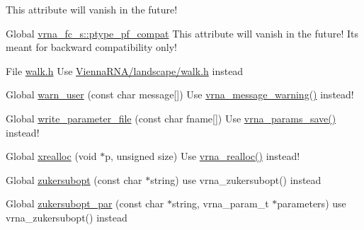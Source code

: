 \begin{DoxyRefList}
%
This attribute will vanish in the future!  
\item[Global \mbox{\hyperlink{group__fold__compound_a7fe1235ce3d41287695f1ae1e283e8fc}{vrna\+\_\+fc\+\_\+s\+::ptype\+\_\+pf\+\_\+compat}} ]\label{deprecated__deprecated000079}%
%
This attribute will vanish in the future! It\textquotesingle{}s meant for backward compatibility only!  
\item[File \mbox{\hyperlink{walk_8h}{walk.h}} ]\label{deprecated__deprecated000141}%
%
Use \mbox{\hyperlink{landscape_2walk_8h}{Vienna\+RNA/landscape/walk.\+h}} instead  
\item[Global \mbox{\hyperlink{utils_2basic_8h_af2355fa8746f2f30fbe71db65dea3d51}{warn\+\_\+user}} (const char message\mbox{[}\mbox{]})]\label{deprecated__deprecated000185}%
%
Use \mbox{\hyperlink{group__message__utils_ga6e07ed24add60693ba886d54d0a46635}{vrna\+\_\+message\+\_\+warning()}} instead!  
\item[Global \mbox{\hyperlink{group__energy__parameters__rw_ga8a43459be386a7489feeab68dc2c6c76}{write\+\_\+parameter\+\_\+file}} (const char fname\mbox{[}\mbox{]})]\label{deprecated__deprecated000153}%
%
Use \mbox{\hyperlink{group__energy__parameters__rw_ga0de3731b3e4017c52bd678549f6c4ae5}{vrna\+\_\+params\+\_\+save()}} instead!  
\item[Global \mbox{\hyperlink{utils_2basic_8h_a9037ada838835b1b9db41581a021b0c8}{xrealloc}} (void $\ast$p, unsigned size)]\label{deprecated__deprecated000188}%
%
Use \mbox{\hyperlink{group__utils_ga27f4719a66c6f90d1cca3d1e6e696c6a}{vrna\+\_\+realloc()}} instead!  
\item[Global \mbox{\hyperlink{group__subopt__zuker_ga0d5104e3ecf119d8eabd40aa5fe47f90}{zukersubopt}} (const char $\ast$string)]\label{deprecated__deprecated000136}%
%
use vrna\+\_\+zukersubopt() instead 
\item[Global \mbox{\hyperlink{group__subopt__zuker_gab6d0ea8cc1d02f6dd831ca81043c9eb8}{zukersubopt\+\_\+par}} (const char $\ast$string, vrna\+\_\+param\+\_\+t $\ast$parameters)]\label{deprecated__deprecated000137}%
%
use vrna\+\_\+zukersubopt() instead
\end{DoxyRefList}